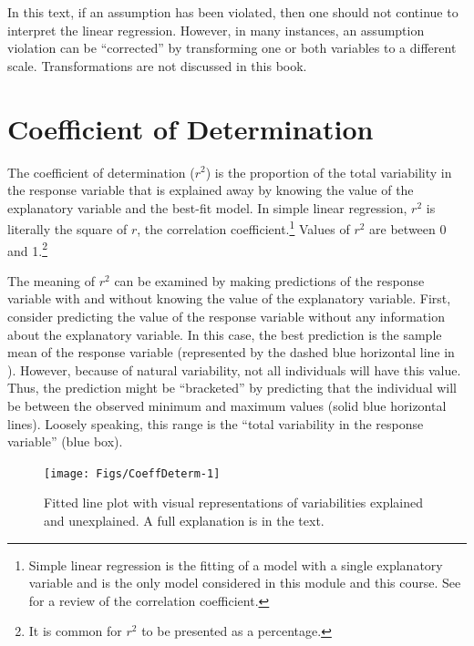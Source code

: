 \documentclass[10pt,openany]{book}\usepackage[]{graphicx}\usepackage[]{color}
\newenvironment{knitrout}{}{} %
\begin{document}
In this text, if an assumption has been violated, then one should not continue to interpret the linear regression. However, in many instances, an assumption violation can be ``corrected'' by transforming one or both variables to a different scale. Transformations are not discussed in this book.



\newpage
\section{Coefficient of Determination}
The coefficient of determination ($r^{2}$) is the proportion of the total variability in the response variable that is explained away by knowing the value of the explanatory variable and the best-fit model. In simple linear regression, $r^{2}$ is literally the square of $r$, the correlation coefficient.\footnote{Simple linear regression is the fitting of a model with a single explanatory variable and is the only model considered in this module and this course. See  for a review of the correlation coefficient.} Values of $r^{2}$ are between 0 and 1.\footnote{It is common for $r^{2}$ to be presented as a percentage.}

The meaning of $r^{2}$ can be examined by making predictions of the response variable with and without knowing the value of the explanatory variable. First, consider predicting the value of the response variable without any information about the explanatory variable. In this case, the best prediction is the sample mean of the response variable (represented by the dashed blue horizontal line in ). However, because of natural variability, not all individuals will have this value. Thus, the prediction might be ``bracketed'' by predicting that the individual will be between the observed minimum and maximum values (solid blue horizontal lines). Loosely speaking, this range is the ``total variability in the response variable'' (blue box).

\begin{knitrout}
\color{fgcolor}\begin{figure}[hbtp]

{\centering \texttt{[image: Figs/CoeffDeterm-1]} 

}

\caption[Fitted line plot with visual representations of variabilities explained and unexplained]{Fitted line plot with visual representations of variabilities explained and unexplained. A full explanation is in the text.}\label{fig:CoeffDeterm}
\end{figure}


\end{knitrout}
\end{document}
